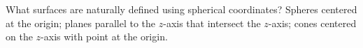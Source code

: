 {What surfaces are naturally defined using spherical coordinates?
}
{Spheres centered at the origin; planes parallel to the $z$-axis that intersect the $z$-axis; cones centered on the $z$-axis with point at the origin.
}
